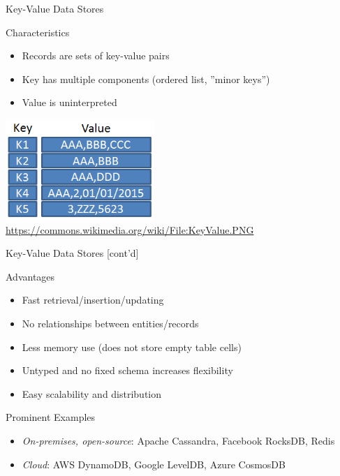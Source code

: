 \documentclass[ignorenonframetext,xcolor=x11names]{beamer}
\begin{document}
\begin{frame}{Key-Value Data Stores}
\begin{block}{Characteristics}
\begin{itemize}
	\item Records are sets of key-value pairs
	\item Key has multiple components (ordered list, ''minor keys'')
	\item Value is uninterpreted
\end{itemize}
\end{block}
\centering
\includegraphics[height=1.5in]{KeyValue.png}
\tiny{\url{https://commons.wikimedia.org/wiki/File:KeyValue.PNG}}
\end{frame}

\begin{frame}{Key-Value Data Stores \small [cont'd]}
\begin{block}{Advantages}
\begin{itemize}
	\item Fast retrieval/insertion/updating
	\item No relationships between entities/records
	\item Less memory use (does not store empty table cells)
	\item Untyped and no fixed schema increases flexibility
	\item Easy scalability and distribution
\end{itemize}
\end{block}
\begin{block}{Prominent Examples}
\begin{itemize}
	\item \emph{On-premises, open-source}: Apache Cassandra, Facebook RocksDB, Redis
	\item \emph{Cloud}: AWS DynamoDB, Google LevelDB, Azure CosmosDB
\end{itemize}
\end{block}
\end{frame}
\end{document}
